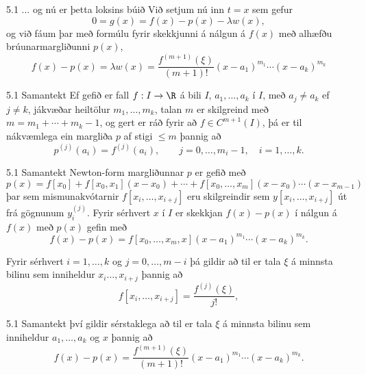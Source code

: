 \begin{frame}{5.1 ... og nú er þetta loksins búið} 
Við setjum nú inn $t=x$ sem gefur 
\begin{equation*}
0=g(x) = f(x) - p(x) - \lambda w(x),
\end{equation*}
og við fáum þar með formúlu fyrir skekkjunni á nálgun á $f(x)$
með alhæfðu brúunarmargliðunni $p(x)$, 
\begin{equation*}
f(x) - p(x) =\lambda w(x) = \dfrac{f^{(m+1)}(\xi)}{(m+1)!} 
(x-a_1)^{m_1} \cdots (x-a_k)^{m_k}
\end{equation*}
\end{frame}

\begin{frame}{5.1 Samantekt} 
Ef gefið er fall $f:I\to \R$ á bili $I$, $a_1,\dots,a_k$ í $I$, 
með $a_j\neq a_k$ ef $j\neq k$, jákvæðar heiltölur $m_1,\dots,m_k$,  
talan $m$ er skilgreind með $m=m_1+\cdots+m_k-1$, og gert er ráð fyrir
að $f\in C^{m+1}(I)$, þá er til nákvæmlega ein margliða $p$
af stigi $\leq m$ þannig að
$$
p^{(j)}(a_i)=f^{(j)}(a_i), \qquad j=0,\dots, m_i-1, \quad i=1,\dots,k. 
$$  
\end{frame} 

\begin{frame}{5.1 Samantekt} 
Newton-form margliðunnar $p$ er gefið með
$$
  p(x)=f[x_0]+f[x_0,x_1](x-x_0)+\cdots+f[x_0,\dots,x_m](x-x_0)\cdots(x-x_{m-1})
$$
þar sem mismunakvótarnir $f[x_i,\dots,x_{i+j}]$ eru skilgreindir sem
$y[x_i,\dots,x_{i+j}]$ út frá gögnunum $y^{(j)}_i$.  Fyrir sérhvert
$x$ í $I$ er skekkjan $f(x)-p(x)$ í nálgun á $f(x)$ með $p(x)$ gefin með
$$
  f(x)-p(x)=f[x_0,\dots,x_m,x](x-a_1)^{m_1}\cdots(x-a_k)^{m_k}.
$$

\pause
Fyrir sérhvert $i=1,\dots,k$ og $j=0,\dots,m-i$ þá gildir að til er
tala $\xi$ á minnsta bilinu sem inniheldur $x_i\dots,x_{i+j}$  þannig
að
$$
  f[x_i,\dots,x_{i+j}]=\dfrac{f^{(j)}(\xi)}{j!},
$$
\end{frame}

\begin{frame}{5.1 Samantekt} 
því gildir sérstaklega að til er tala $\xi$ á minnsta bilinu sem
inniheldur $a_1,\dots,a_k$ og $x$ þannig að 
$$
f(x)-p(x)=\dfrac{f^{(m+1)}(\xi)}{(m+1)!}(x-a_1)^{m_1}\cdots(x-a_k)^{m_k}.
$$
\end{frame}

